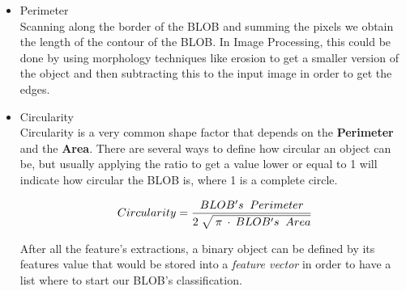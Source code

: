 \begin{itemize}
\item Perimeter\\
Scanning along the border of the BLOB and summing the pixels we obtain the length of the contour of the BLOB. In Image Processing, this could be done by using morphology techniques like erosion to get a smaller version of the object and then subtracting this to the input image in order to get the edges.\\
\item Circularity\\
Circularity is a very common shape factor that depends on the \textbf{Perimeter} and the \textbf{Area}. There are several ways to define how circular an object can be, but usually applying the ratio to get a value lower or equal to 1 will indicate how circular the BLOB is, where 1 is a complete circle.

\begin{equation}	
	\begin{aligned}
	{Circularity}=\displaystyle\frac{BLOB's \;\; Perimeter}{2 \; \sqrt{\mathstrut \: \pi \: \cdot \: {BLOB's \;\; Area}}}
	\label{Circularity}
	\end{aligned}
\end{equation}


After all the feature's extractions, a binary object can be defined by its features value that would be stored into a \textit{feature vector} in order to have a list where to start our BLOB's classification.

\end{itemize}




